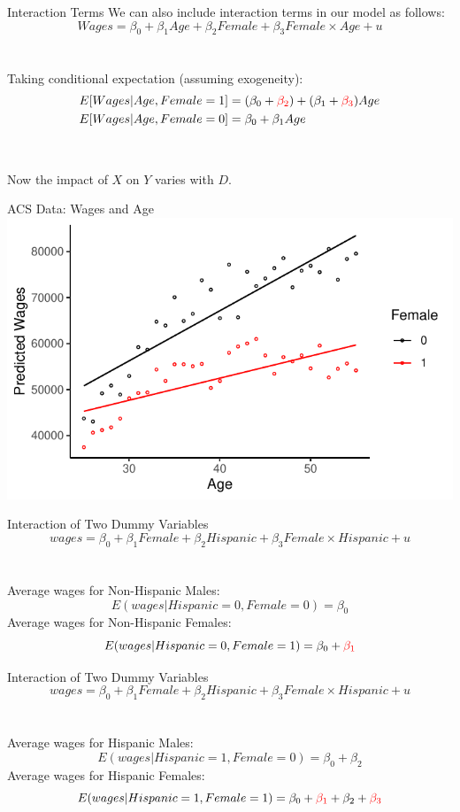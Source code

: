 \documentclass{./../div_teaching_slides}
\begin{document}
\begin{frame}{Interaction Terms}
We can also include interaction terms in our model as follows:
$$ Wages = \beta_0 + \beta_1 Age + \beta_2 Female + \beta_3 Female \times Age +  u  $$ \\~\\
Taking conditional expectation (assuming exogeneity):
\begin{align*}
	E[Wages | Age, Female=1] &= (\beta_0+\textcolor{red}{\beta_2}) + (\beta_1+\textcolor{red}{\beta_3}) Age
 \\
	E[Wages | Age, Female=0] &= \beta_0 + \beta_1 Age
	\end{align*} \\~\\
Now the impact of $X$ on $Y$ varies with $D$.
\end{frame}

\begin{frame}{ACS Data: Wages and Age}
\centering
\includegraphics{./../../output/fit_gender_age_inter.pdf}
\end{frame}

\begin{frame}{Interaction of Two Dummy Variables}
\vspace{-1em}
$$ wages = \beta_0 + \beta_1 Female + \beta_2 Hispanic + \beta_3 Female \times Hispanic +  u  $$ \\~\\
Average wages for Non-Hispanic Males:
$$ E(wages|Hispanic=0, Female=0) = \beta_0  $$ 
Average wages for Non-Hispanic Females:
$$ E(wages|Hispanic=0, Female=1) = \beta_0 + \textcolor{red}{\beta_1}  $$
\end{frame}

\begin{frame}{Interaction of Two Dummy Variables}
\vspace{-1em}
$$ wages = \beta_0 + \beta_1 Female + \beta_2 Hispanic + \beta_3 Female \times Hispanic +  u  $$ \\~\\
Average wages for Hispanic Males:
$$ E(wages|Hispanic=1, Female=0) = \beta_0 + \beta_2  $$ 
Average wages for Hispanic Females:
$$ E(wages|Hispanic=1, Female=1) = \beta_0 + \textcolor{red}{\beta_1} + \beta_2 + \textcolor{red}{\beta_3}  $$
\end{frame}
\end{document}
